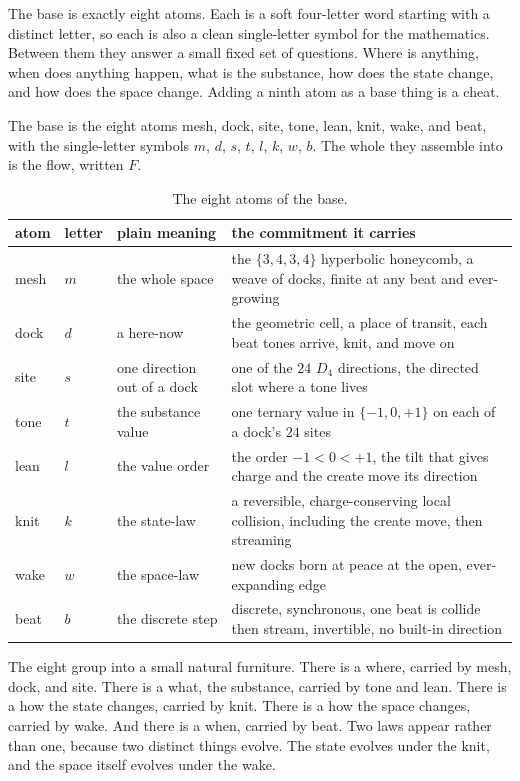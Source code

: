The base is exactly eight atoms. Each is a soft four-letter word starting with a distinct letter, so each is also a clean single-letter symbol for the mathematics. Between them they answer a small fixed set of questions. Where is anything, when does anything happen, what is the substance, how does the state change, and how does the space change. Adding a ninth atom as a base thing is a cheat.

\begin{definition}
The base is the eight atoms mesh, dock, site, tone, lean, knit, wake, and beat, with the single-letter symbols $m$, $d$, $s$, $t$, $l$, $k$, $w$, $b$. The whole they assemble into is the flow, written $F$.
\end{definition}

\begin{table}[ht]
\centering
\begin{tabular}{@{}llll@{}}
\toprule
atom & letter & plain meaning & the commitment it carries \\
\midrule
mesh & $m$ & the whole space & the $\{3,4,3,4\}$ hyperbolic honeycomb, a weave of docks, finite at any beat and ever-growing \\
dock & $d$ & a here-now & the geometric cell, a place of transit, each beat tones arrive, knit, and move on \\
site & $s$ & one direction out of a dock & one of the $24$ $D_4$ directions, the directed slot where a tone lives \\
tone & $t$ & the substance value & one ternary value in $\{-1, 0, +1\}$ on each of a dock's $24$ sites \\
lean & $l$ & the value order & the order $-1 < 0 < +1$, the tilt that gives charge and the create move its direction \\
knit & $k$ & the state-law & a reversible, charge-conserving local collision, including the create move, then streaming \\
wake & $w$ & the space-law & new docks born at peace at the open, ever-expanding edge \\
beat & $b$ & the discrete step & discrete, synchronous, one beat is collide then stream, invertible, no built-in direction \\
\bottomrule
\end{tabular}
\caption{The eight atoms of the base.}
\label{tab:atoms}
\end{table}

The eight group into a small natural furniture. There is a where, carried by mesh, dock, and site. There is a what, the substance, carried by tone and lean. There is a how the state changes, carried by knit. There is a how the space changes, carried by wake. And there is a when, carried by beat. Two laws appear rather than one, because two distinct things evolve. The state evolves under the knit, and the space itself evolves under the wake.

